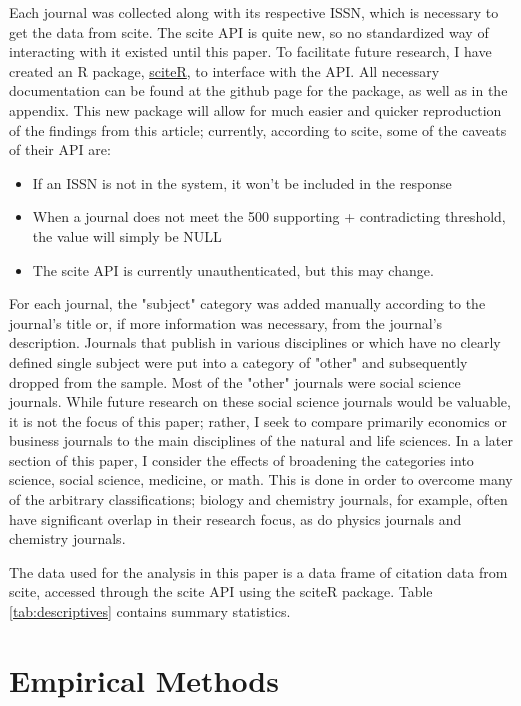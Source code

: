 \documentclass[12pt,english]{article}
\begin{document}
Each journal was collected along with its respective ISSN, which is necessary to get the data from scite. The scite API is quite new, so no standardized way of interacting with it existed until this paper. To facilitate future research, I have created an R package, \href{https://github.com/masonrhayes/sciteR}{sciteR}, to interface with the API. All necessary documentation can be found at the github page for the package, as well as in the appendix. This new package will allow for much easier and quicker reproduction of the findings from this article; currently, according to scite, some of the caveats of their API are:
\begin{itemize}
    \item If an ISSN is not in the system, it won’t be included in the response
    \item When a journal does not meet the 500 supporting + contradicting threshold, the value will simply be NULL
    \item The scite API is currently unauthenticated, but this may change.
\end{itemize}


For each journal, the "subject" category was added manually according to the journal's title or, if more information was necessary, from the journal's description. Journals that publish in various disciplines or which have no clearly defined single subject were put into a category of "other" and subsequently dropped from the sample. Most of the "other" journals were social science journals. While future research on these social science journals would be valuable, it is not the focus of this paper; rather, I seek to compare primarily economics or business journals to the main disciplines of the natural and life sciences. In a later section of this paper, I consider the effects of broadening the categories into science, social science, medicine, or math. This is done in order to overcome many of the arbitrary classifications; biology and chemistry journals, for example, often have significant overlap in their research focus, as do physics journals and chemistry journals.

The data used for the analysis in this paper is a data frame of citation data from scite, accessed through the scite API using the sciteR package. Table \ref{tab:descriptives} contains summary statistics.


\section{Empirical Methods}\label{sec:methods}
\end{document}
